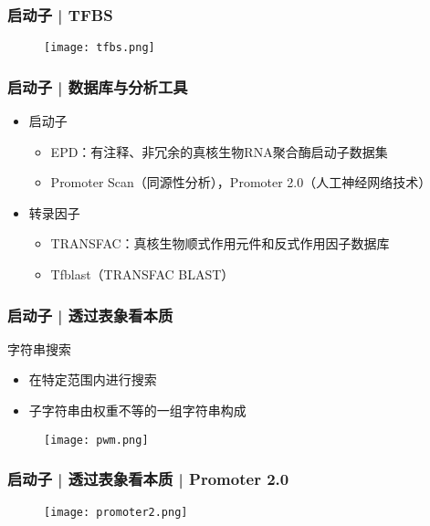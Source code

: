 \begin{frame}
  \frametitle{启动子 | TFBS}
  \begin{figure}
    \centering
    \texttt{[image: tfbs.png]}
  \end{figure}
\end{frame}

\begin{frame}
  \frametitle{启动子 | 数据库与分析工具}
  \begin{itemize}
    \item 启动子
      \begin{itemize}
	\item EPD：有注释、非冗余的真核生物RNA聚合酶启动子数据集
        \item Promoter Scan（同源性分析），Promoter 2.0（人工神经网络技术）
      \end{itemize}
    \item 转录因子
      \begin{itemize}
        \item TRANSFAC：真核生物顺式作用元件和反式作用因子数据库
        \item Tfblast（TRANSFAC BLAST）
      \end{itemize}
  \end{itemize}
\end{frame}

\begin{frame}
  \frametitle{启动子 | 透过表象看本质}
  \begin{block}{字符串搜索}
    \begin{itemize}
      \item 在特定范围内进行搜索
      \item 子字符串由权重不等的一组字符串构成
    \end{itemize}
  \end{block}
  \pause
  \begin{figure}
    \centering
    \texttt{[image: pwm.png]}
  \end{figure}
\end{frame}


\begin{frame}
  \frametitle{启动子 | 透过表象看本质 | Promoter 2.0}
  \begin{figure}
    \centering
    \texttt{[image: promoter2.png]}
  \end{figure}
\end{frame}

